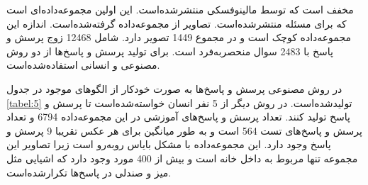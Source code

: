 	 مخفف
است که توسط مالینوفسکی منتشر‌شده‌است. این اولین مجموعه‌داده‌ای است که برای مسئله 
 منتشر‌شده‌است. تصاویر از مجموعه‌داده
  \cite{silberman2012indoor}
   گرفته‌شده‌است.  اندازه این مجموعه‌داده کوچک است و در مجموع 1449 تصویر دارد. 
 شامل 12468 زوج پرسش و پاسخ با 2483 سوال منحصربه‌فرد است. برای تولید پرسش و پاسخ‌ها از دو روش مصنوعی و انسانی استفاده‌شده‌است. 
 \begin{table}
 	\caption{
 		الگوهای استفاده شده برای تولید  سوال در مجموعه‌داده 
 		.
 		 سوالات می‌تواند در مورد یک تصاویر و یا مجموعه‌ای از تصاویر باشد
 		\cite{goyal2017making}
 		 .}
 	\label{tabel:5}
 \end{table}
 در روش مصنوعی پرسش و پاسخ‌ها به صورت خودکار از الگوهای موجود در جدول
 \ref{tabel:5}
  تولید‌شده‌است. در روش دیگر از 5 نفر انسان خواسته‌شده‌است تا پرسش و پاسخ تولید کنند. تعداد پرسش و پاسخ‌های آموزشی در این مجموعه‌داده 6794 و تعداد پرسش و پاسخ‌های تست 564 است و به طور میانگین برای هر عکس تقریبا 9 پرسش و پاسخ وجود دارد. این مجموعه‌داده با مشکل بایاس روبه‌رو است زیرا تصاویر این مجموعه تنها مربوط به داخل خانه است و بیش از 400 مورد وجود دارد که اشیایی مثل میز و صندلی در پاسخ‌ها تکرارشده‌است.

